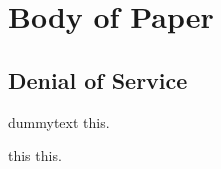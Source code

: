 \chapter{Body of Paper} \label{ch:body}
\section{Denial of Service} \label{sec:dos}


dummytext this.

this this.

